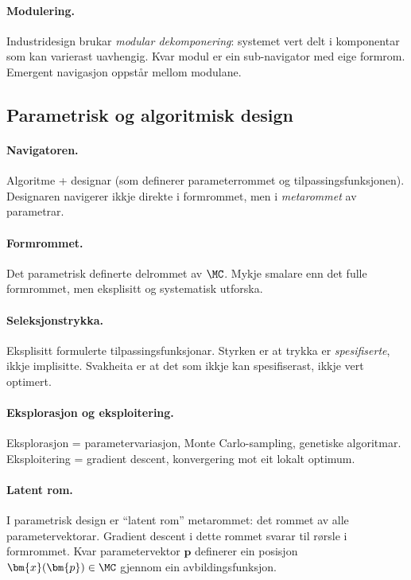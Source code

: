 \paragraph{Modulering.}
Industridesign brukar \emph{modular dekomponering}: systemet vert
delt i komponentar som kan varierast uavhengig. Kvar modul er ein
sub-navigator med eige formrom. Emergent navigasjon oppstår
mellom modulane.

\subsection{Parametrisk og algoritmisk design}

\paragraph{Navigatoren.}
Algoritme + designar (som definerer parameterrommet og
tilpassingsfunksjonen). Designaren navigerer ikkje direkte i
formrommet, men i \emph{metarommet} av parametrar.

\paragraph{Formrommet.}
Det parametrisk definerte delrommet av $\MC$. Mykje smalare enn
det fulle formrommet, men eksplisitt og systematisk utforska.

\paragraph{Seleksjonstrykka.}
Eksplisitt formulerte tilpassingsfunksjonar. Styrken er at
trykka er \emph{spesifiserte}, ikkje implisitte. Svakheita er at
det som ikkje kan spesifiserast, ikkje vert optimert.

\paragraph{Eksplorasjon og eksploitering.}
Eksplorasjon = parametervariasjon, Monte Carlo-sampling,
genetiske algoritmar. Eksploitering = gradient descent,
konvergering mot eit lokalt optimum.

\paragraph{Latent rom.}
I parametrisk design er ``latent rom'' metarommet: det rommet av
alle parametervektorar. Gradient descent i dette rommet svarar
til rørsle i formrommet. Kvar parametervektor $\bm{p}$ definerer
ein posisjon $\bm{x}(\bm{p}) \in \MC$ gjennom ein avbildingsfunksjon.


